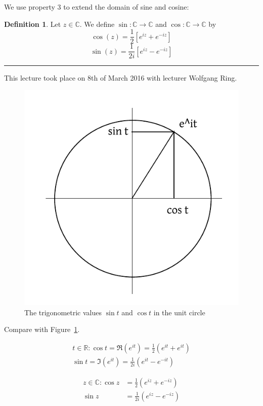 \documentclass[a4paper,landscape,twocolumn]{article}
\theoremstyle{definition}
\newtheorem{defi}{Definition}
\newcommand\meta[3]{\hrule{} This #1 took place on #2 with lecturer #3.\par}
\begin{document}
We use property 3 to extend the domain of sine and cosine:
\begin{defi}
  Let $z \in \mathbb C$. We define $\sin: \mathbb C \to \mathbb C$
  and $\cos: \mathbb C \to \mathbb C$ by
  \[ \cos(z) = \frac12 \left[e^{iz} + e^{-iz}\right] \]
  \[ \sin(z) = \frac1{2i} \left[e^{iz} - e^{-iz}\right] \]
\end{defi}

\meta{lecture}{8th of March 2016}{Wolfgang Ring}

\begin{figure}
  \begin{center}
    \includegraphics{img/complex_unit.pdf}
    \caption{The trigonometric values $\sin{t}$ and $\cos{t}$ in the unit circle}
    \label{img:cossin}
  \end{center}
\end{figure}
%
Compare with Figure~\ref{img:cossin}.

\begin{align*}
  t \in \mathbb R:
    \cos{t} = \Re(e^{it}) = \frac12 (e^{it} + e^{it}) \\
    \sin{t} = \Im(e^{it}) = \frac{1}{2i} (e^{it} - e^{-it})
\end{align*}

\begin{align*}
  z \in \mathbb C:
    \cos{z} &= \frac12 (e^{iz} + e^{-iz}) \\
    \sin{z} &= \frac{1}{2i} (e^{iz} - e^{-iz})
\end{align*}
\end{document}
